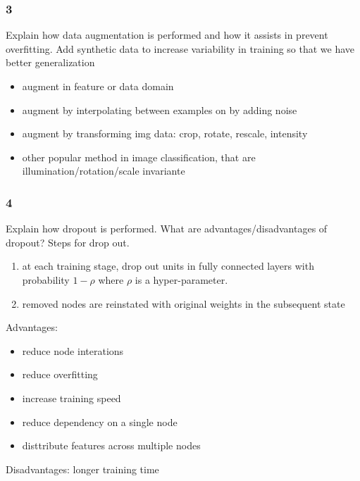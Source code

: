 \documentclass{article}
\begin{document}
\subsubsection*{3}
\begin{myleftlinebox}
    Explain how data augmentation is performed and how it assists in prevent overfitting.
    \tcblower
    Add synthetic data to increase variability in training so that we have better generalization
    \begin{itemize}
        \item augment in feature or data domain
        \item augment by interpolating between examples on by adding noise
        \item augment by transforming img data: crop, rotate, rescale, intensity
        \item other popular method in image classification, that are illumination/rotation/scale invariante
    \end{itemize}
\end{myleftlinebox}

\subsubsection*{4}
\begin{myleftlinebox}
    Explain how dropout is performed. What are advantages/disadvantages of dropout?
    \tcblower
    Steps for drop out.
    \begin{enumerate}
        \item at each training stage, drop out units in fully connected layers with probability \(1-\rho\) where \(\rho\) is a hyper-parameter. 
        \item removed nodes are reinstated with original weights in the subsequent state
    \end{enumerate}
    Advantages:
    \begin{itemize}
        \item reduce node interations
        \item reduce overfitting
        \item increase training speed
        \item reduce dependency on a single node
        \item disttribute features across multiple nodes    
    \end{itemize}
    Disadvantages: longer training time
\end{myleftlinebox}
\end{document}
